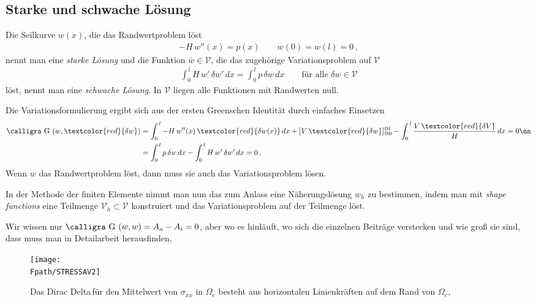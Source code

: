 {%
\textcolor{blau2}{\section{Starke und schwache L\"{o}sung}}
Die Seilkurve $w(x)$, die das Randwertproblem l\"{o}st
\begin{align}
- H\,w''(x) = p(x)  \qquad w(0) = w(l) = 0\,,
\end{align}
nennt man eine {\em starke L\"{o}sung\/} und die Funktion $\bar{w} \in \mathcal{V}$, die das zugeh\"{o}rige Variationsproblem auf $\mathcal{V}$
\begin{align}
\int_0^{\,l} H\,w'\,\delta w'\,dx = \int_0^{\,l} p\,\delta w\,dx  \qquad \text{f\"{u}r alle $\delta w \in \mathcal{V}$}
\end{align}
l\"{o}st, nennt man eine {\em schwache L\"{o}sung\/}. In $\mathcal{V}$ liegen alle Funktionen mit Randwerten null.

Die Variationsformulierung ergibt sich aus der ersten Greenschen Identit\"{a}t durch einfaches Einsetzen
\begin{align}
\text{\normalfont\calligra G\,\,}(w,\textcolor{red}{\delta w}) &= \int_0^{\,l} - H\,w''(x)\,\textcolor{red}{\delta w(x)}\,dx + [V\,\textcolor{red}{\delta w}]_{@0}^{@l}- \int_0^{\,l} \frac{V\,\textcolor{red}{\delta V}}{H}\,dx  = 0\nn \\
&= \int_0^{\,l} p\,\delta w\,dx - \int_0^{\,l} H\,w'\,\delta w'\,dx = 0\,.
\end{align}%
Wenn $w$ das Randwertproblem l\"{o}st, dann muss sie auch das Variationsproblem l\"{o}sen.

In der Methode der finiten Elemente nimmt man nun das zum Anlass eine N\"{a}herungsl\"{o}sung $w_h$ zu bestimmen, indem man mit {\em shape functions\/} eine Teilmenge $\mathcal{V}_h \subset \mathcal{V}$ konstruiert und das Variationsproblem auf der Teilmenge l\"{o}st.

Wir wissen nur
$\text{\normalfont\calligra G\,\,}(w,w) = A_a - A_i = 0$, aber wo es hinl\"{a}uft, wo sich die einzelnen Beitr\"{a}ge verstecken und wie gro{\ss} sie sind, dass muss man in Detailarbeit herausfinden.

\begin{figure}[tbp]
\if {} \sidecaption \fi
\texttt{[image: \\Fpath/STRESSAV2]}
\caption{Das \lqq Dirac Delta\rqq \,f\"{u}r den Mittelwert von $\sigma_{xx}$ in
$\Omega_e$ besteht aus horizontalen Linienkr\"{a}ften auf dem Rand von $\Omega_e$, \cite{Ha5}}
\label{StressAV}
\end{figure}%

}
